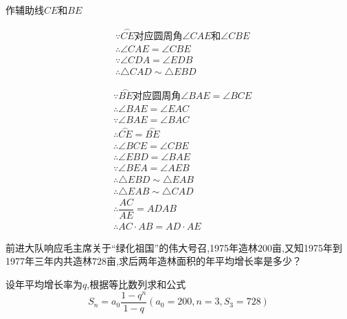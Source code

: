 \begin{questions}
\begin{proofsolution}
		\begin{cenum}
			\item 作辅助线$CE$和$BE$
			\item
			      \begin{align*}
				       & \because \overset{\frown}{CE}\text{对应圆周角}\angle{CAE}\text{和}\angle{CBE} \\
				       & \therefore \angle{CAE} = \angle{CBE}                                    \\
				       & \because \angle{CDA} = \angle{EDB}                                      \\
				       & \therefore \triangle{CAD} \sim \triangle{EBD}
			      \end{align*}
			\item
			      \begin{align*}
				       & \because\overset{\frown}{BE}对应圆周角\angle{BAE} = \angle{BCE} \\
				       & \therefore\angle{BAE} = \angle{EAC}                        \\
				       & \because \angle{BAE} = \angle{BAC}                         \\
				       & \therefore\overset{\frown}{CE} = \overset{\frown}{BE}      \\
				       & \therefore\angle{BCE} = \angle{CBE}                        \\
				       & \therefore\angle{EBD} = \angle{BAE}                        \\
				       & \because\angle{BEA} = \angle{AEB}                          \\
				       & \therefore\triangle{EBD} \sim \triangle{EAB}               \\
				       & \therefore\triangle{EAB} \sim \triangle{CAD}               \\
				       & \therefore\dfrac{AC}{AE}={AD}{AB}                          \\
				       & \therefore AC\cdot AB = AD\cdot AE
			      \end{align*}
		\end{cenum}
	\end{proofsolution}
	\question[8]
	前进大队响应毛主席关于\enquote{绿化祖国}的伟大号召,1975年造林$200$亩,又知1975年到1977年三年内共造林$728$亩,求后两年造林面积的年平均增长率是多少？
	\begin{solution}
		设年平均增长率为$q$,根据等比数列求和公式
		\begin{equation*}
			S_n = a_0\frac{1-q^n}{1-q} (a_0 = 200, n = 3, S_3 = 728)
		\end{equation*}


\end{solution}
\end{questions}

